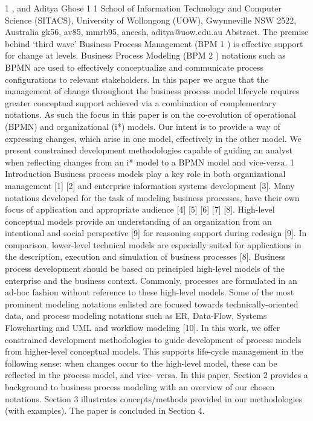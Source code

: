 1
,
and Aditya Ghose
1
1
School of Information Technology and Computer Science (SITACS),
University of Wollongong (UOW), Gwynneville NSW 2522, Australia
{gk56, av85, mmrb95, aneesh, aditya}@uow.edu.au
Abstract. The premise behind ‘third wave’ Business Process Management
(BPM
1
) is effective support for change at levels. Business Process Modeling
(BPM
2
) notations such as BPMN are used to effectively conceptualize and
communicate process configurations to relevant stakeholders. In this paper we
argue that the management of change throughout the business process model
lifecycle requires greater conceptual support achieved via a combination of
complementary notations. As such the focus in this paper is on the co-evolution
of operational (BPMN) and organizational (i*) models. Our intent is to provide
a way of expressing changes, which arise in one model, effectively in the other
model. We present constrained development methodologies capable of guiding
an analyst when reflecting changes from an i* model to a BPMN model and
vice-versa.
1 Introduction
Business process models play a key role in both organizational management [1] [2]
and enterprise information systems development [3]. Many notations developed for
the task of modeling business processes, have their own focus of application and
appropriate audience [4] [5] [6] [7] [8]. High-level conceptual models provide an
understanding of an organization from an intentional and social perspective [9] for
reasoning support during redesign [9]. In comparison, lower-level technical models
are especially suited for applications in the description, execution and simulation of
business processes [8].
Business process development should be based on principled high-level models of
the enterprise and the business context. Commonly, processes are formulated in an
ad-hoc fashion without reference to these high-level models. Some of the most
prominent modeling notations enlisted are focused towards technically-oriented data,
and process modeling notations such as ER, Data-Flow, Systems Flowcharting and
UML and workflow modeling [10]. In this work, we offer constrained development
methodologies to guide development of process models from higher-level conceptual
models. This supports life-cycle management in the following sense: when changes
occur to the high-level model, these can be reflected in the process model, and vice-
versa. In this paper, Section 2 provides a background to business process modeling
with an overview of our chosen notations. Section 3 illustrates concepts/methods
provided in our methodologies (with examples). The paper is concluded in Section 4.
